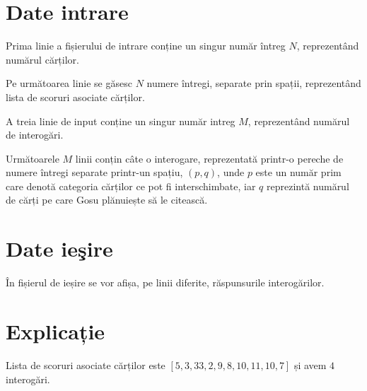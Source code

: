 \documentclass[ro]{problem}
\begin{document}
\section{Date intrare}

Prima linie a fișierului de intrare conține un singur număr întreg $N$, reprezentând numărul cărților.

Pe următoarea linie se găsesc $N$ numere întregi, separate prin spații, reprezentând lista de scoruri asociate cărților.

A treia linie de input conține un singur număr intreg $M$, reprezentând numărul de interogări.

Următoarele $M$ linii conțin câte o interogare, reprezentată printr-o pereche de numere întregi separate printr-un spațiu, $(p, q)$, unde $p$ este un număr prim care denotă categoria cărților ce pot fi interschimbate, iar $q$ reprezintă numărul de cărți pe care Gosu plănuiește să le citească.

\section{Date ieşire}

În fișierul de ieșire se vor afișa, pe linii diferite, răspunsurile interogărilor. 

\begin{restrictions}

\end{restrictions}

\begin{examples}
%
\end{examples}

\section{Explicație}

Lista de scoruri asociate cărților este $[5, 3, 33, 2, 9, 8, 10, 11, 10, 7]$ și avem $4$ interogări.
\end{document}
